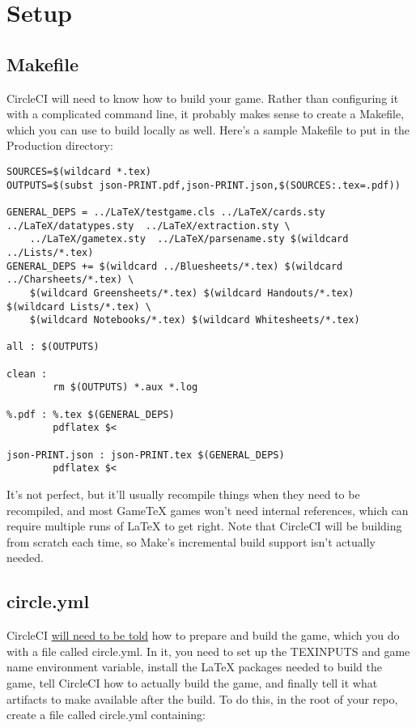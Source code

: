 \documentclass[green]{testgame}
\begin{document}
\section{Setup}
\label{sec:repo}

\subsection{Makefile}
\label{sec:makefile}

CircleCI will need to know how to build your game. Rather than configuring it with a complicated command line, it probably makes sense to create a Makefile, which you can use to build locally as well. Here's a sample Makefile to put in the Production directory:

\begin{verbatim}
SOURCES=$(wildcard *.tex)
OUTPUTS=$(subst json-PRINT.pdf,json-PRINT.json,$(SOURCES:.tex=.pdf))

GENERAL_DEPS = ../LaTeX/testgame.cls ../LaTeX/cards.sty  ../LaTeX/datatypes.sty  ../LaTeX/extraction.sty \
    ../LaTeX/gametex.sty  ../LaTeX/parsename.sty $(wildcard ../Lists/*.tex)
GENERAL_DEPS += $(wildcard ../Bluesheets/*.tex) $(wildcard ../Charsheets/*.tex) \
    $(wildcard Greensheets/*.tex) $(wildcard Handouts/*.tex) $(wildcard Lists/*.tex) \
    $(wildcard Notebooks/*.tex) $(wildcard Whitesheets/*.tex)

all : $(OUTPUTS)

clean :
        rm $(OUTPUTS) *.aux *.log

%.pdf : %.tex $(GENERAL_DEPS)
        pdflatex $<

json-PRINT.json : json-PRINT.tex $(GENERAL_DEPS)
        pdflatex $<
\end{verbatim}

It's not perfect, but it'll usually recompile things when they need to be recompiled, and most GameTeX games won't need internal references, which can require multiple runs of \LaTeX{} to get right. Note that CircleCI will be building from scratch each time, so Make's incremental build support isn't actually needed.

\subsection{circle.yml}
\label{sec:circle.yml}

CircleCI \href{https://circleci.com/docs/configuration/}{will need to be told} how to prepare and build the game, which you do with a file called circle.yml. In it, you need to set up the TEXINPUTS and game name environment variable, install the LaTeX packages needed to build the game, tell CircleCI how to actually build the game, and finally tell it what artifacts to make available after the build. To do this, in the root of your repo, create a file called circle.yml containing:
\end{document}

